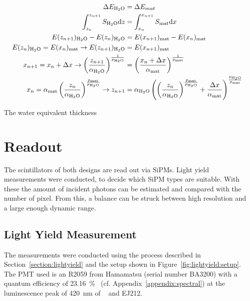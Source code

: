 \begin{align}
    \label{eq:detector:absorber:thickness}
    \Delta E_{\ce{H2O}} &= \Delta E_{mat} \\
    \int_{z_n}^{z_{n+1}} S_{\ce{H2O}}\text{d}z &= \int_{x_n}^{x_{n+1}} S_\text{mat}\text{d}x \\
    E(z_{n+1})_{\ce{H2O}}-E(z_n)_{\ce{H2O}}&= E(x_{n+1})_{\text{mat}}-E(x_n)_{\text{mat}}\\
    E(z_n)_{\ce{H2O}} = E(x_n)_{\text{mat}} \rightarrow E(z_{n+1})_{\ce{H2O}} &= E(x_{n+1})_{\text{mat}} \\
    x_{n+1} = x_n + \Delta x \rightarrow \left(\frac{z_{n+1}}{\alpha_{\ce{H2O}}}\right)^{\frac{1}{p_{\ce{H2O}}}} &= \left(\frac{x_{n}+\Delta x}{\alpha_{\text{mat}}}\right)^{\frac{1}{p_{\text{mat}}}} \\
    x_{n} = \alpha_{\text{mat}} \left(\frac{z_n}{\alpha_{\ce{H2O}}}\right)^{\frac{p_{\text{mat}}}{p_{\ce{H2O}}}} \rightarrow z_{n+1} &= \alpha_{\ce{H2O}} \left(\left(\frac{z_n}{\alpha_{\ce{H2O}}}\right)^{\frac{p_{\text{mat}}}{p_{\ce{H2O}}}} + \frac{\Delta x}{\alpha_{\text{mat}}}\right)^{\frac{p_{\ce{H2O}}}{p_{\text{mat}}}}
\end{align}

The water equivalent thickness 

\section{Readout}\label{section:readout}
The scintillators of both designs are read out via SiPMs.
Light yield measurements were conducted, to decide which SiPM types are suitable.
With these the amount of incident photons can be estimated and compared with the number of pixel.
From this, a balance can be struck between high resolution and a large enough dynamic range.
 
\subsection{Light Yield Measurement}
The measurements were conducted using the process described in Section~\ref{section:lightyield} and the setup shown in Figure~\ref{fig:lightyield:setup}.
The PMT used is an R2059 from Hamamatsu (serial number BA3200) with a quantum efficiency of \SI{23.16}{\percent}~\cite{datasheet:hamamatsu_R2059} (cf. Appendix~\ref{appendix:spectral}) at the luminescence peak of \SI{420}{\nano\meter} of ~\cite{cms:tdr} and EJ212.

